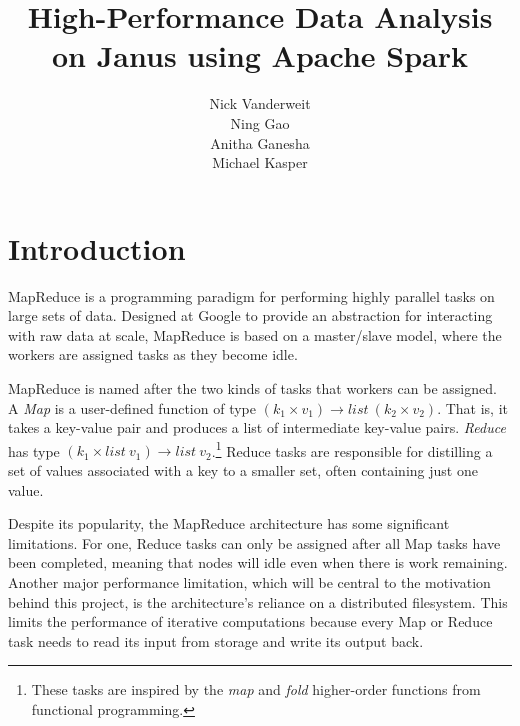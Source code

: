 \documentclass{article}
\title{High-Performance Data Analysis on Janus using Apache Spark}
\author{Nick Vanderweit \\
        Ning Gao \\
        Anitha Ganesha \\
        Michael Kasper}
\begin{document}
\maketitle

\begin{abstract}
\end{abstract}

\section*{Introduction}
MapReduce\citep{dean-mapreduce} is a programming paradigm for performing highly
parallel tasks on large sets of data. Designed at Google to provide an
abstraction for interacting with raw data at scale, MapReduce is based on
a master/slave model, where the workers are assigned tasks as they become idle.

MapReduce is named after the two kinds of tasks that workers can be assigned.
A \emph{Map} is a user-defined function of type
$(k_1 \times v_1) \rightarrow list \: (k_2 \times v_2)$.
That is, it takes a key-value pair and produces a list of
intermediate key-value pairs. \emph{Reduce} has type
$(k_1 \times list \: v_1) \rightarrow list \: v_2$.\footnote{
These tasks are inspired by the \emph{map} and \emph{fold}
higher-order functions from functional programming.}
Reduce tasks are responsible for distilling a set of values associated with
a key to a smaller set, often containing just one value.

Despite its popularity, the MapReduce architecture has some significant
limitations\citep{lee-survey}. For one, Reduce tasks can only be assigned after
all Map tasks have been completed, meaning that nodes will idle even when there
is work remaining. Another major performance limitation, which will be central
to the motivation behind this project, is the architecture's reliance on a
distributed filesystem. This limits the performance of iterative computations
because every Map or Reduce task needs to read its input from storage and write
its output back.
\end{document}
